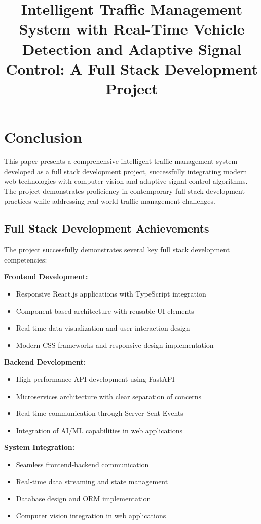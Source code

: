 \documentclass[conference]{IEEEtran}
\begin{document}
\title{Intelligent Traffic Management System with Real-Time Vehicle Detection and Adaptive Signal Control: A Full Stack Development Project}

\au\section{Conclusion}

This paper presents a comprehensive intelligent traffic management system developed as a full stack development project, successfully integrating modern web technologies with computer vision and adaptive signal control algorithms. The project demonstrates proficiency in contemporary full stack development practices while addressing real-world traffic management challenges.

\subsection{Full Stack Development Achievements}

The project successfully demonstrates several key full stack development competencies:

\textbf{Frontend Development:}
\begin{itemize}
\item Responsive React.js applications with TypeScript integration
\item Component-based architecture with reusable UI elements
\item Real-time data visualization and user interaction design
\item Modern CSS frameworks and responsive design implementation
\end{itemize}

\textbf{Backend Development:}
\begin{itemize}
\item High-performance API development using FastAPI
\item Microservices architecture with clear separation of concerns
\item Real-time communication through Server-Sent Events
\item Integration of AI/ML capabilities in web applications
\end{itemize}

\textbf{System Integration:}
\begin{itemize}
\item Seamless frontend-backend communication
\item Real-time data streaming and state management
\item Database design and ORM implementation
\item Computer vision integration in web applications
\end{itemize}
\end{document}
